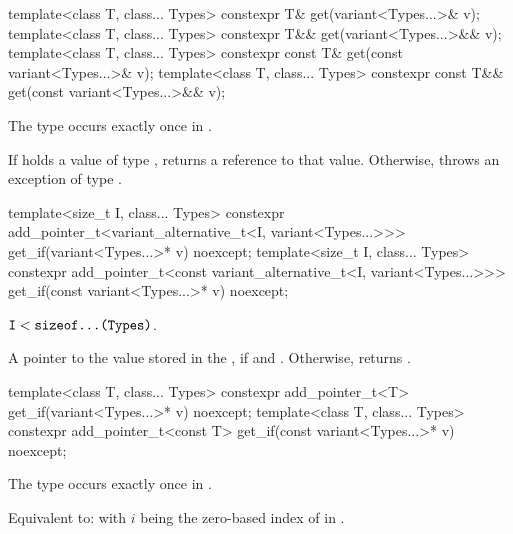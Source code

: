 %
\begin{itemdecl}
template<class T, class... Types> constexpr T& get(variant<Types...>& v);
template<class T, class... Types> constexpr T&& get(variant<Types...>&& v);
template<class T, class... Types> constexpr const T& get(const variant<Types...>& v);
template<class T, class... Types> constexpr const T&& get(const variant<Types...>&& v);
\end{itemdecl}

\begin{itemdescr}
\pnum
\mandates
The type  occurs exactly once in .

\pnum
\effects
If  holds a value of type , returns a reference to that value.
Otherwise, throws an exception of type .
\end{itemdescr}

%
%
\begin{itemdecl}
template<size_t I, class... Types>
  constexpr add_pointer_t<variant_alternative_t<I, variant<Types...>>>
    get_if(variant<Types...>* v) noexcept;
template<size_t I, class... Types>
  constexpr add_pointer_t<const variant_alternative_t<I, variant<Types...>>>
    get_if(const variant<Types...>* v) noexcept;
\end{itemdecl}

\begin{itemdescr}
\pnum
\mandates
$\texttt{\protect I} < \texttt{\protect sizeof...(Types)}$.

\pnum
\returns
A pointer to the value stored in the , if 
and . Otherwise, returns .
\end{itemdescr}

%
%
\begin{itemdecl}
template<class T, class... Types>
  constexpr add_pointer_t<T>
    get_if(variant<Types...>* v) noexcept;
template<class T, class... Types>
  constexpr add_pointer_t<const T>
    get_if(const variant<Types...>* v) noexcept;
\end{itemdecl}

\begin{itemdescr}
\pnum
\mandates
The type  occurs exactly once in .

\pnum
\effects
Equivalent to:  with $i$ being the zero-based
index of  in .
\end{itemdescr}

